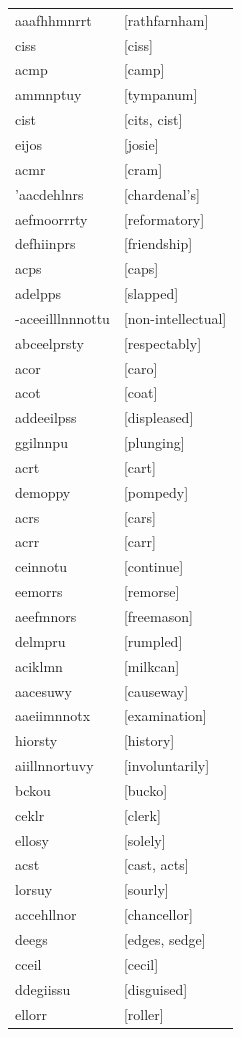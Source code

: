 \documentclass{article}
\begin{document}
\begin{tabular}{ll}
aaafhhmnrrt & [rathfarnham] \\
ciss & [ciss] \\
acmp & [camp] \\
ammnptuy & [tympanum] \\
cist & [cits, cist] \\
eijos & [josie] \\
acmr & [cram] \\
'aacdehlnrs & [chardenal's] \\
aefmoorrrty & [reformatory] \\
defhiinprs & [friendship] \\
acps & [caps] \\
adelpps & [slapped] \\
-aceeilllnnnottu & [non-intellectual] \\
abceelprsty & [respectably] \\
acor & [caro] \\
acot & [coat] \\
addeeilpss & [displeased] \\
ggilnnpu & [plunging] \\
acrt & [cart] \\
demoppy & [pompedy] \\
acrs & [cars] \\
acrr & [carr] \\
ceinnotu & [continue] \\
eemorrs & [remorse] \\
aeefmnors & [freemason] \\
delmpru & [rumpled] \\
aciklmn & [milkcan] \\
aacesuwy & [causeway] \\
aaeiimnnotx & [examination] \\
hiorsty & [history] \\
aiillnnortuvy & [involuntarily] \\
bckou & [bucko] \\
ceklr & [clerk] \\
ellosy & [solely] \\
acst & [cast, acts] \\
lorsuy & [sourly] \\
accehllnor & [chancellor] \\
deegs & [edges, sedge] \\
cceil & [cecil] \\
ddegiissu & [disguised] \\
ellorr & [roller] \\

\end{tabular}
\end{document}
